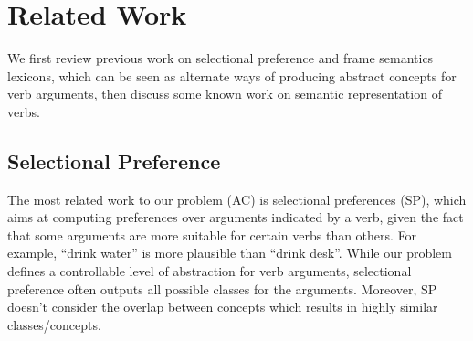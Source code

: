 \section{Related Work}
\label{sec:related}
We first review previous work on selectional preference and 
frame semantics lexicons, which can be seen as alternate ways of
producing abstract concepts for verb arguments, then discuss
some known work on semantic representation of verbs. 

\subsection{Selectional Preference}
The most related work to our problem (AC) is
selectional preferences (SP), which
aims at computing preferences over arguments indicated by a verb,
given the fact that some arguments are more
suitable for certain verbs than others. For example,
``drink water'' is more plausible than ``drink desk''.
While our problem defines a controllable level of abstraction
for verb arguments, selectional preference
often outputs all possible classes for the arguments.
Moreover, SP doesn't consider the overlap between concepts
which results in highly similar classes/concepts.

